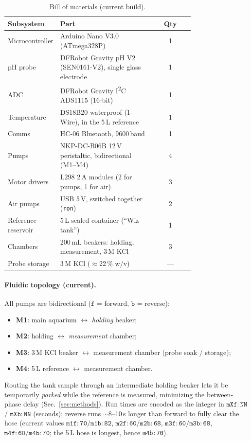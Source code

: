 \documentclass[11pt]{article}
\begin{document}
\begin{table}[t]
\centering
\caption{Bill of materials (current build).}
\label{tab:bom}
\footnotesize
\begin{tabular}{@{}p{0.26\linewidth} p{0.50\linewidth} c@{}}
\toprule
Subsystem & Part & Qty \\
\midrule
Microcontroller & Arduino Nano V3.0 (ATmega328P) & 1 \\
pH probe & DFRobot Gravity pH V2 (SEN0161-V2), single glass electrode & 1 \\
ADC & DFRobot Gravity I\textsuperscript{2}C ADS1115 (16-bit) & 1 \\
Temperature & DS18B20 waterproof (1-Wire), in the 5\,L reference & 1 \\
Comms & HC-06 Bluetooth, 9600\,baud & 1 \\
Pumps & NKP-DC-B06B 12\,V peristaltic, bidirectional (M1--M4) & 4 \\
Motor drivers & L298 2\,A modules (2 for pumps, 1 for air) & 3 \\
Air pumps & USB 5\,V, switched together (\texttt{ron}) & 2 \\
Reference reservoir & 5\,L sealed container (``Wiz tank'') & 1 \\
Chambers & 200\,mL beakers: holding, measurement, 3\,M KCl & 3 \\
Probe storage & 3\,M KCl ($\approx$22\,\% w/v) & --- \\
\bottomrule
\end{tabular}
\end{table}

\paragraph{Fluidic topology (current).} All pumps are bidirectional
($\mathtt{f}$ = forward, $\mathtt{b}$ = reverse):
\begin{itemize}[nosep,leftmargin=1.4em]
\item \textbf{M1}: main aquarium $\leftrightarrow$ \emph{holding} beaker;
\item \textbf{M2}: holding $\leftrightarrow$ \emph{measurement} chamber;
\item \textbf{M3}: 3\,M KCl beaker $\leftrightarrow$ measurement chamber (probe soak / storage);
\item \textbf{M4}: 5\,L reference $\leftrightarrow$ measurement chamber.
\end{itemize}
Routing the tank sample through an intermediate holding beaker lets it be
temporarily \emph{parked} while the reference is measured, minimizing the
between-phase delay (Sec.~\ref{sec:methods}). Run times are encoded as the
integer in $\mathtt{mXf{:}NN}$ / $\mathtt{mXb{:}NN}$ (seconds); reverse runs
$\sim$8--10\,s longer than forward to fully clear the hose (current values
$\mathtt{m1f{:}70/m1b{:}82}$, $\mathtt{m2f{:}60/m2b{:}68}$,
$\mathtt{m3f{:}60/m3b{:}68}$, $\mathtt{m4f{:}60/m4b{:}70}$; the 5\,L hose is
longest, hence \texttt{m4b:70}).
\end{document}
